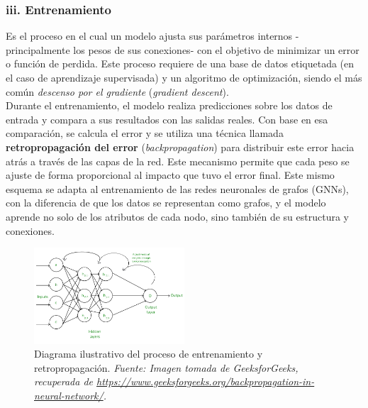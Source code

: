 \documentclass[11pt]{article} %
\begin{document}
\subsubsection{iii. Entrenamiento}
Es el proceso en el cual un modelo ajusta sus parámetros internos -principalmente los pesos de sus conexiones- con el objetivo de minimizar un error o función de perdida. Este proceso requiere de una base de datos etiquetada (en el caso de aprendizaje supervisada) y un algoritmo de optimización, siendo el más común \textit{descenso por el gradiente} (\textit{gradient descent}).\\[1pt]
Durante el entrenamiento, el modelo realiza predicciones sobre los datos de entrada y compara a sus resultados con las salidas reales. Con base en esa comparación, se calcula el error y se utiliza una técnica llamada \textbf{retropropagación del error} 
(\textit{backpropagation}) para distribuir este error hacia atrás a través de las capas de la red. Este mecanismo permite que cada peso se ajuste de forma proporcional al impacto que tuvo el error final. Este mismo esquema se adapta al entrenamiento de las redes neuronales de grafos (GNNs), con la diferencia de que los datos se representan como grafos, y el modelo aprende no solo de los atributos de cada nodo, sino también de su estructura y conexiones.
\begin{figure}[H]
    \centering
    \includegraphics[width=0.5\textwidth]{Images/Frame-13.png}
    \caption{Diagrama ilustrativo del proceso de entrenamiento y retropropagación. \textit{Fuente: Imagen tomada de GeeksforGeeks, recuperada de \url{https://www.geeksforgeeks.org/backpropagation-in-neural-network/}.}}
    \label{fig:Backpropagaion}
\end{figure}

\vspace{7pt}
\end{document}
